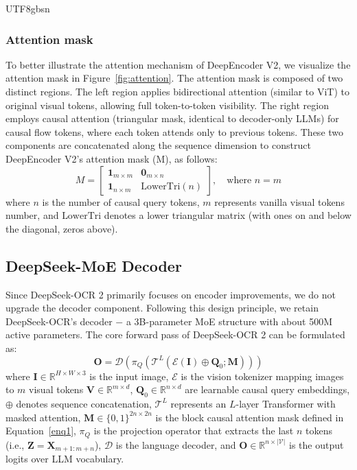 \documentclass[11pt, a4paper, logo, copyright, nonumbering]{deepseek}
\begin{document}
\begin{CJK*}{UTF8}{gbsn}
\subsubsection{Attention mask}
To better illustrate the attention mechanism of DeepEncoder V2, we visualize the attention mask in Figure~\ref{fig:attention}. The attention mask is composed of two distinct regions. The left region applies bidirectional attention (similar to ViT) to original visual tokens, allowing full token-to-token visibility. The right region employs causal attention (triangular mask, identical to decoder-only LLMs) for causal flow tokens, where each token attends only to previous tokens. These two components are concatenated along the sequence dimension to construct DeepEncoder V2's attention mask (M), as follows:
\begin{equation}
M = \begin{bmatrix}
\mathbf{1}_{m \times m} & \mathbf{0}_{m \times n} \\
\mathbf{1}_{n \times m} & \text{LowerTri}(n)
\end{bmatrix},
\quad \text{where } n = m
\label{enq1}
\end{equation}
where $n$ is the number of causal query tokens, $m$ represents vanilla visual tokens number, and $\text{LowerTri}$ denotes a lower triangular matrix (with ones on and below the diagonal, zeros above). 





\subsection{DeepSeek-MoE Decoder}

Since DeepSeek-OCR 2 primarily focuses on encoder improvements, we do not upgrade the decoder component. Following this design principle,  we retain DeepSeek-OCR's decoder $-$ a 3B-parameter MoE structure with about 500M active parameters. The core forward pass of DeepSeek-OCR 2 can be formulated as:
\begin{equation}
\mathbf{O} = \mathcal{D}\left(\pi_Q\left(\mathcal{T}^L\left(\mathcal{E}(\mathbf{I}) \oplus \mathbf{Q}_0; \mathbf{M}\right)\right)\right)
\label{enq2}
\end{equation}
where $\mathbf{I} \in \mathbb{R}^{H \times W \times 3}$ is the input image, $\mathcal{E}$ is the vision tokenizer mapping images to $m$ visual tokens $\mathbf{V} \in \mathbb{R}^{m \times d}$, $\mathbf{Q}_0 \in \mathbb{R}^{n \times d}$ are learnable causal query embeddings, $\oplus$ denotes sequence concatenation, $\mathcal{T}^L$ represents an $L$-layer Transformer with masked attention, $\mathbf{M} \in \{0,1\}^{2n \times 2n}$ is the block causal attention mask defined in Equation~\ref{enq1}, $\pi_Q$ is the projection operator that extracts the last $n$ tokens (i.e., $\mathbf{Z} = \mathbf{X}_{m+1:m+n}$), $\mathcal{D}$ is the language decoder, and $\mathbf{O} \in \mathbb{R}^{n \times |\mathcal{V}|}$ is the output logits over LLM vocabulary.





\end{CJK*}
\end{document}
